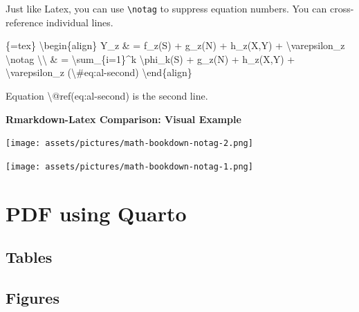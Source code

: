 \documentclass[
  letterpaper,
  DIV=11,
  numbers=noendperiod]{scrreprt}
\newenvironment{Shaded}{\begin{snugshade}}{\end{snugshade}}
\newcommand{\NormalTok}[1]{\textcolor[rgb]{0.00,0.23,0.31}{#1}}
\begin{document}
Just like Latex, you can use \texttt{\textbackslash{}notag} to suppress
equation numbers. You can cross-reference individual lines.

\begin{Shaded}
\begin{Highlighting}[]
\NormalTok{\textasciigrave{}\textasciigrave{}\textasciigrave{}\{=tex\}}
\NormalTok{\textbackslash{}begin\{align\}}
\NormalTok{Y\_z \& = f\_z(S) + g\_z(N) + h\_z(X,Y) + \textbackslash{}varepsilon\_z \textbackslash{}notag \textbackslash{}\textbackslash{}}
\NormalTok{\& = \textbackslash{}sum\_\{i=1\}\^{}k \textbackslash{}phi\_k(S) + g\_z(N) + h\_z(X,Y) + \textbackslash{}varepsilon\_z (\textbackslash{}\#eq:al{-}second)}
\NormalTok{\textbackslash{}end\{align\}}
\NormalTok{\textasciigrave{}\textasciigrave{}\textasciigrave{}}

\NormalTok{Equation \textbackslash{}@ref(eq:al{-}second) is the second line.}
\end{Highlighting}
\end{Shaded}

\begin{tcolorbox}[enhanced jigsaw, colframe=quarto-callout-note-color-frame, breakable, left=2mm, toprule=.15mm, colback=white, arc=.35mm, rightrule=.15mm, bottomrule=.15mm, opacityback=0, leftrule=.75mm]

\textbf{Rmarkdown-Latex Comparison: Visual Example}\vspace{2mm}

\texttt{[image: assets/pictures/math-bookdown-notag-2.png]}

\texttt{[image: assets/pictures/math-bookdown-notag-1.png]}

\end{tcolorbox}


\hypertarget{sec-quarto-pdf}{%
\chapter{PDF using Quarto}\label{sec-quarto-pdf}}

\hypertarget{tables-1}{%
\section{Tables}\label{tables-1}}

\hypertarget{figures-1}{%
\section{Figures}\label{figures-1}}
\end{document}
